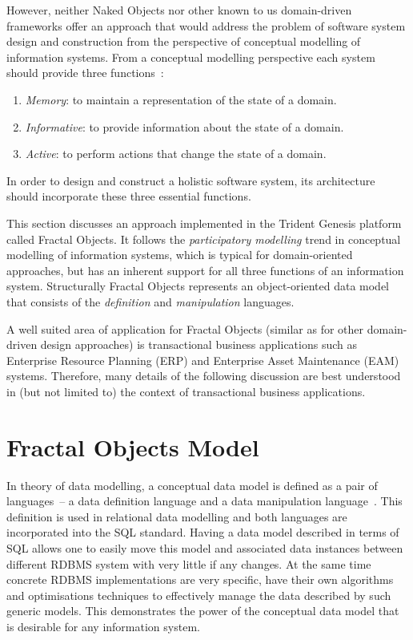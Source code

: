   However, neither Naked Objects nor other known to us domain-driven frameworks offer an approach that would address the problem of software system design and construction from the perspective of conceptual modelling of information systems.
  From a conceptual modelling perspective each system should provide three functions~\cite{oli2007}: 
  \begin{enumerate}
    \item \emph{Memory}: to maintain a representation of the state of a domain.
    \item \emph{Informative}: to provide information about the state of a domain.
    \item \emph{Active}: to perform actions that change the state of a domain. 
  \end{enumerate}
 
  In order to design and construct a holistic software system, its architecture should incorporate these three essential functions.

  This section discusses an approach implemented in the Trident Genesis platform called Fractal Objects. 
  It follows the \emph{participatory modelling} trend in conceptual modelling of information systems, which is typical for domain-oriented approaches, but has an inherent support for all three functions of an information system.  
  Structurally Fractal Objects represents an object-oriented data model that consists of the \emph{definition} and \emph{manipulation} languages.
  
  A well suited area of application for Fractal Objects (similar as for other domain-driven design approaches) is transactional business applications such as Enterprise Resource Planning (ERP) and Enterprise Asset Maintenance (EAM) systems.
  Therefore, many details of the following discussion are best understood in (but not limited to) the context of transactional business applications.
  
\section{Fractal Objects Model}

  In theory of data modelling, a conceptual data model is defined as a pair of languages~-- a data definition language and a data manipulation language~\cite{kal1983}.
  This definition is used in relational data modelling and both languages are incorporated into the SQL standard.
  Having a data model described in terms of SQL allows one to easily move this model and associated data instances between different RDBMS system with very little if any changes.
  At the same time concrete RDBMS implementations are very specific, have their own algorithms and optimisations techniques to effectively manage the data described by such generic models.
  This demonstrates the power of the conceptual data model that is desirable for any information system.
  
